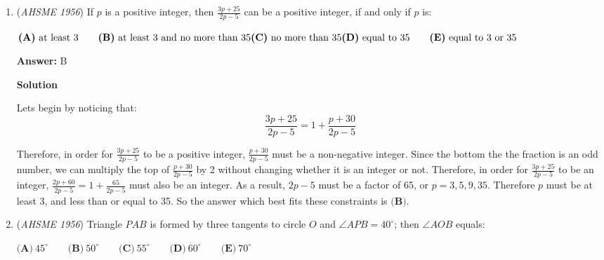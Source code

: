 \begin{enumerate}
 $\textbf{(A)}\ 6 \qquad \textbf{(B)}\ 12 \qquad \textbf{(C)}\ 15 \qquad \textbf{(D)}\ 18 \qquad \textbf{(E)}\ 36$

 \textbf{Answer: }D



\textbf{Solution}

In 1 day, $x$ machines can do $\frac {1}{3}$ of the job , and $x + 3$ machines$\frac {1}{2}$of the job. So  $3$ machines can do $\frac {1}{2} -\frac {1}{3}=\frac {1}{6}$ of the job in 1 day, and 1 machine can do$\frac {1}{18}$ of the job in 1 day. Hence, **18** days are needed for 1 machine to complete the job;

 


	\item (\textit{AHSME 1956}) If $p$ is a positive integer, then $\frac {3p + 25}{2p - 5}$ can be a positive integer, if and only if $p$ is: 


 $\textbf{(A)}\ \text{at least }3\qquad \textbf{(B)}\ \text{at least }3\text{ and no more than }35\qquad \\ \textbf{(C)}\ \text{no more than }35  \textbf{(D)}\ \text{equal to }35 \qquad \textbf{(E)}\ \text{equal to }3\text{ or }35$

 \textbf{Answer: }B



\textbf{Solution}

Lets begin by noticing that:
 \[\frac{3p+25}{2p-5} = 1 + \frac{p+30}{2p-5}\]

 Therefore, in order for $\frac{3p+25}{2p-5}$ to be a positive integer, $\frac{p+30}{2p-5}$ must be a non-negative integer. Since the bottom the the fraction is an odd number, we can multiply the top of $\frac{p+30}{2p-5}$ by 2 without changing whether it is an integer or not. Therefore, in order for $\frac{3p+25}{2p-5}$ to be an integer, $\frac{2p+60}{2p-5} = 1 + \frac{65}{2p-5}$ must also be an integer. As a result, $2p-5$ must be a factor of 65, or $p = 3, 5, 9, 35$. Therefore $p$ must be at least 3, and less than or equal to 35. So the answer which best fits these constraints is $\boxed{\textbf{(B)}}$.

 


	\item (\textit{AHSME 1956}) Triangle $PAB$ is formed by three tangents to circle $O$ and $\angle APB = 40^{\circ}$; then $\angle AOB$ equals: 


 $\textbf{(A)}\ 45^{\circ}\qquad \textbf{(B)}\ 50^{\circ}\qquad \textbf{(C)}\ 55^{\circ}\qquad \textbf{(D)}\ 60^{\circ}\qquad \textbf{(E)}\ 70^{\circ}$


\end{enumerate}
